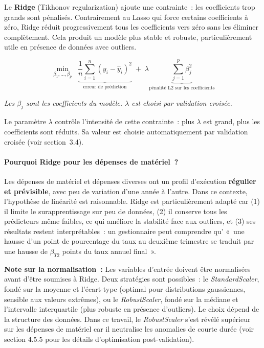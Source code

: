 Le \textbf{Ridge} (Tikhonov regularization) ajoute une contrainte~: les coefficients
trop grands sont pénalisés. Contrairement au Lasso qui force certains coefficients
à zéro, Ridge réduit progressivement tous les coefficients vers zéro sans les
éliminer complètement. Cela produit un modèle plus stable et robuste, particulièrement
utile en présence de données avec outliers.

$$\min_{\beta_1,\ldots,\beta_p} \;\; \underbrace{\frac{1}{n}\sum_{i=1}^{n}(y_i - \hat{y}_i)^2}_{\text{erreur de prédiction}} \;+\; \lambda \underbrace{\sum_{j=1}^{p}\beta_j^2}_{\text{pénalité L2 sur les coefficients}}$$

\noindent\small\textit{Les $\beta_j$ sont les coefficients du modèle. $\lambda$ est choisi par validation croisée.}\normalsize

Le paramètre $\lambda$ contrôle l'intensité de cette contrainte~: plus $\lambda$ est
grand, plus les coefficients sont réduits. Sa valeur est choisie automatiquement par
validation croisée (voir section~3.4).

\paragraph{Pourquoi Ridge pour les dépenses de matériel~?}

Les dépenses de matériel et dépenses diverses ont un profil d'exécution
\textbf{régulier et prévisible}, avec peu de variation d'une année à l'autre. Dans
ce contexte, l'hypothèse de linéarité est raisonnable. Ridge est particulièrement
adapté car (1) il limite le surapprentissage sur peu de données, (2) il conserve
tous les prédicteurs même faibles, ce qui améliore la stabilité face aux outliers,
et (3) ses résultats restent interprétables~: un gestionnaire peut comprendre qu'
«~une hausse d'un point de pourcentage du taux au deuxième trimestre se traduit par
une hausse de $\beta_{T2}$ points du taux annuel final~».

\textbf{Note sur la normalisation~:} Les variables d'entrée doivent être normalisées avant
d'être soumises à Ridge. Deux stratégies sont possibles~: le \textit{StandardScaler},
fondé sur la moyenne et l'écart-type (optimal pour distributions gaussiennes, sensible
aux valeurs extrêmes), ou le \textit{RobustScaler}, fondé sur la médiane et l'intervalle
interquartile (plus robuste en présence d'outliers). Le choix dépend de la structure
des données. Dans ce travail, le \textit{RobustScaler} s'est révélé supérieur sur
les dépenses de matériel car il neutralise les anomalies de courte durée (voir
section 4.5.5 pour les détails d'optimisation post-validation).

